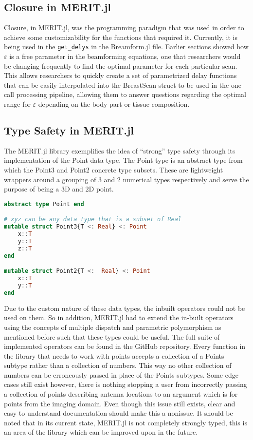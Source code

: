 \subsection{Closure in MERIT.jl}
Closure, in MERIT.jl, was the programming paradigm that was used in order to achieve some customizability for the
functions that required it. Currently, it is being used in the \lstinline[language=Julia]{get_delys} in the Breamform.jl
file. Earlier sections showed how $\varepsilon$ is a free parameter in the beamforming equations, one that researchers
would be changing frequently to find the optimal parameter for each particular scan. This allows researchers to quickly
create a set of parametrized delay functions that can be easily interpolated into the BreastScan struct to be used in
the one-call processing pipeline, allowing them to answer questions regarding the optimal range for $\varepsilon$
depending on the body part or tissue composition.

\subsection{Type Safety in MERIT.jl}
The MERIT.jl library exemplifies the idea of ``strong'' type safety through its implementation of the Point data type.
The Point type is an abstract type from which the Point3 and Point2 concrete type subsets. These are lightweight
wrappers around a grouping of 3 and 2 numerical types respectively and serve the purpose of being a 3D and 2D point.
\begin{lstlisting}[language=Julia]
abstract type Point end

# xyz can be any data type that is a subset of Real
mutable struct Point3{T <: Real} <: Point
    x::T
    y::T
    z::T 
end

mutable struct Point2{T <:  Real} <: Point
    x::T
    y::T
end
\end{lstlisting}
Due to the custom nature of these data types, the inbuilt operators could not be used on them. So in addition, MERIT.jl
had to extend the in-built operators using the concepts of multiple dispatch and parametric polymorphism as mentioned
before such that these types could be useful. The full suite of implemented operators can be found in the GitHub
repository. Every function in the library that needs to work with points accepts a collection of a Points subtype
rather than a collection of numbers. This way no other collection of numbers can be erroneously passed in place of the
Points subtypes. Some edge cases still exist however, there is nothing stopping a user from incorrectly passing a
collection of points describing antenna locations to an argument which is for points from the imaging domain. Even
though this issue still exists, clear and easy to understand documentation should make this a nonissue. It should be
noted that in its current state, MERIT.jl is not completely strongly typed, this is an area of the library which can be
improved upon in the future. 
